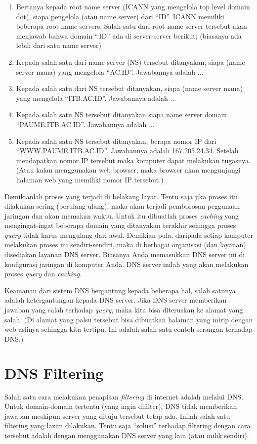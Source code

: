 \begin{enumerate}
   \item Bertanya kepada root name server (ICANN yang mengelola top level
      domain dot), siapa pengelola (atau name server) dari ``ID''. ICANN
      memiliki beberapa root name servers. Salah satu dari root name server
      tersebut akan menjawab bahwa domain ``.ID'' ada di server-server berikut;
      (biasanya ada lebih dari satu name server)
   \item Kepada salah satu dari name server (NS) tersebut ditanyakan, siapa (name
      server mana) yang mengelola ``AC.ID''. Jawabannya adalah ...
   \item Kepada salah satu dari NS tersebut ditanyakan, siapa (name
      server mana) yang mengelola ``ITB.AC.ID''. Jawabannya adalah ...
   \item Kepada salah satu NS tersebut ditanyakan siapa name server domain
      ``PAUME.ITB.AC.ID''. Jawabannya adalah ...
   \item Kepada salah satu NS tersebut ditanyakan, berapa nomor IP dari
      ``WWW.PAUME.ITB.AC.ID''. Jawabannya adalah 167.205.24.34. Setelah
      mendapatkan nomor IP tersebut maka komputer dapat melakukan tugasnya.
      (Atau kalau menggunakan web browser, maka browser akan mengunjungi
      halaman web yang memiliki nomor IP tersebut.)
\end{enumerate}

Demikianlah proses yang terjadi di belakang layar. Tentu saja jika proses itu
dilakukan sering (berulang-ulang), maka akan terjadi pemborosan peggunaan
jaringan dan akan memakan waktu. Untuk itu dibuatlah proses {\em caching} yang
mengingat-ingat beberapa domain yang ditanyakan terakhir sehingga proses {\em
query} tidak harus mengulang dari awal. Demikian pula, daripada setiap komputer
melakukan proses ini sendiri-sendiri, maka di berbagai organisasi (dan layanan)
disediakan layanan DNS server. Biasanya Anda memasukkan DNS server ini di
konfigurasi jaringan di komputer Anda. DNS server inilah yang akan melakukan
proses {\em query} dan {\em caching}. 

Keamanan dari sistem DNS bergantung kepada beberapa hal, salah satunya adalah
ketergantungan kepada DNS server. Jika DNS server memberikan jawaban yang salah
terhadap {\em query}, maka kita bisa diteruskan ke alamat yang salah. (Di
alamat yang palsu tersebut bisa dibuatkan halaman yang mirip dengan web aslinya
sehingga kita tertipu. Ini adalah salah satu contoh serangan terhadap DNS.)


\section{DNS Filtering}
Salah satu cara melakukan penapisan {\em filtering} di internet adalah melalui
DNS. Untuk domain-domain tertentu (yang ingin difilter), DNS tidak memberikan
jawaban meskipun server yang dituju tersebut tetap ada. Inilah salah satu
filtering yang lazim dilakukan.
Tentu saja ``solusi'' terhadap filtering dengan cara tersebut adalah dengan 
menggunakan DNS server yang lain (atau milik sendiri).

